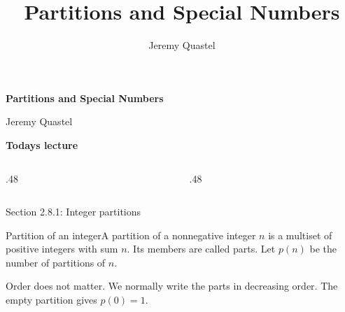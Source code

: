 \documentclass[aspectratio=169,11pt]{beamer}
\title{Partitions and Special Numbers}
\author{Jeremy Quastel}\date{}
\newcommand{\Def}[2]{\begin{block}{#1}#2\end{block}}
\newcommand{\gap}{\par\medskip}
\begin{document}
\begin{frame}[plain]\begin{center}{\Huge\bfseries Partitions and Special Numbers}\par\vspace{.25cm}{\Large Section 2.8.1--2.8.5}\par{}\par\vspace{.1cm}\par\vspace{.25cm}Jeremy Quastel\end{center}\end{frame}
\begin{frame}[plain]\large \begin{center}{\Huge\bfseries Today\textquotesingle s lecture}\par\vspace{.5cm}\end{center}\begin{columns}[c,onlytextwidth]\begin{column}{.48\textwidth}\end{column}\begin{column}{.48\textwidth}\end{column}\end{columns}\end{frame}
\begin{frame}{Section 2.8.1: Integer partitions}
\large
\Def{Partition of an integer}{A partition of a nonnegative integer $n$ is a multiset of positive integers with sum $n$. Its members are called parts. Let $p(n)$ be the number of partitions of $n$.}
\gap Order does not matter. We normally write the parts in decreasing order. The empty partition gives $p(0)=1$.
\end{frame}
\end{document}
